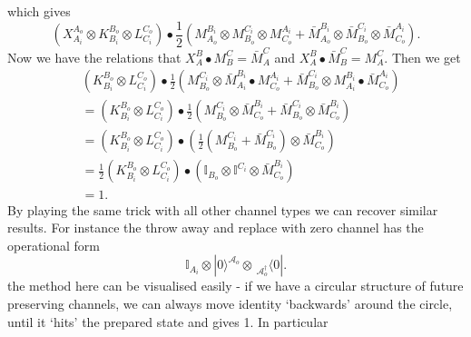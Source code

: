 \documentclass[aps,pra, twocolumn]{revtex4-1}
\begin{document}
which gives
\begin{equation}
(X_{A_i}^{A_o} \otimes  K_{B_i}^{B_o} \otimes  L_{C_i}^{C_o}) \bullet  \frac{1}{2}(M_{A_o} ^{B_i}\otimes M_{B_o} ^{C_i} \otimes M_{C_o} ^{A_i} + \bar{M}_{A_o} ^{B_i} \otimes \bar{M}_{B_o} ^{C_i} \otimes \bar{M}_{C_o} ^{A_i}).
\end{equation}
Now we have the relations that
$X_{A}^{B} \bullet  M_{B}^{C}= \bar{M}_{A}^{C}$
and
$X_{A}^{B} \bullet \bar{M}_{B}^{C}=M_{A}^{C}$.
Then we get 
\begin{align}
& ( K_{B_i}^{B_o} \otimes  L_{C_i}^{C_o}) \bullet  \frac{1}{2}(M_{B_o} ^{C_i} \otimes \bar{M}_{A_i} ^{B_i}  \bullet M_{C_o} ^{A_i} + \bar{M}_{B_o} ^{C_i} \otimes M_{A_i} ^{B_i}  \bullet \bar{M}_{C_o} ^{A_i})\nonumber \\
& = ( K_{B_i}^{B_o} \otimes  L_{C_i}^{C_o}) \bullet  \frac{1}{2}( M_{B_o} ^{C_i} \otimes \bar{M}_{C_o} ^{B_i} +  \bar{M}_{B_o} ^{C_i} \otimes \bar{M}_{C_o} ^{B_i})\nonumber \\
& = ( K_{B_i}^{B_o} \otimes  L_{C_i}^{C_o}) \bullet  ( \frac{1}{2}(M_{B_o} ^{C_i} +\bar{M}_{B_o} ^{C_i}) \otimes \bar{M}_{C_o} ^{B_i} )\nonumber \\
& = \frac{1}{2}( K_{B_i}^{B_o} \otimes  L_{C_i}^{C_o}) \bullet  ( \mathbb{I}_{B_o} \otimes \mathbb{I}^{C_i}  \otimes \bar{M}_{C_o} ^{B_i} )\nonumber \\
&=1.
\end{align}
By playing the same trick with all other channel types we can recover similar results. For instance the throw away and replace with zero channel has the operational form
\begin{equation}
\mathbb{I}_{A_i} \otimes |0 \rangle ^{\mathcal{A}_o}\! \otimes\! \,_{\mathcal{A}^{\dagger}_o} \langle 0|.
\end{equation}
the method here can be visualised easily - if we have a circular structure of future preserving channels, we can always move identity `backwards' around the circle, until it `hits' the prepared state and gives 1. In particular 
\end{document}
